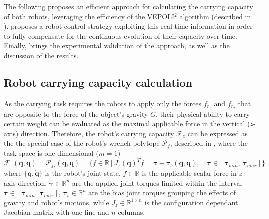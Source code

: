 The following  proposes an efficient approach for calculating the carrying capacity of both robots, leveraging the efficiency of the VEPOLI$^2$ algorithm (described in ).  proposes a robot control strategy exploiting this real-time information in order to fully compensate for the continuous evolution of their capacity over time. Finally,  brings the experimental validation of the approach, as well as the discussion of the results. 

\subsection{Robot carrying capacity calculation}
\label{sec:robot_carrying_capacity}


As the carrying task requires the robots to apply only the forces $f_{r_1}$ and $f_{r_2}$ that are opposite to the force of the object's gravity $G$, their physical ability to carry certain weight can be evaluated as the maximal applicable force in the vertical ($z$-axis) direction. Therefore, the robot's carrying capacity $\mathcal{F}_z$ can be expressed as the the special case of the robot's wrench polytope $\mathcal{P}_{f}$, described in , where the task space is one dimensional ($m=1$)
\begin{equation}
    \mathcal{F}_z (\bm{q},\dot{\bm{q}}) = \mathcal{P}_{f_z} (\bm{q},\dot{\bm{q}}) = \{ f \in \mathbb{R} ~|~ J_{z}(\bm{q})^Tf=\bm{\tau} - \bm{\tau}_b(\bm{q},\dot{\bm{q}}), \quad \bm{\tau}\in[\bm{\tau}_{min}, ~\bm{\tau}_{max}]\}
\end{equation}
where $\{\bm{q},\dot{\bm{q}}\}$ is the robot's joint state, $f \in\mathbb{R}$ is the applicable scalar force in $z$-axis direction, $\bm{\tau}\in\mathbb{R}^n$ are the applied joint torques limited within the interval $\bm{\tau}\in[\bm{\tau}_{min}, ~\bm{\tau}_{max}]$, $\bm{\tau}_{b}\in\mathbb{R}^n$ are the bias joint torques grouping the effects of gravity and robot's motions, while $J_{z}\in\mathbb{R}^{1\times n}$ is the configuration dependant Jacobian matrix with one line and $n$ columns.

